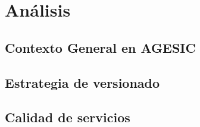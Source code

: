 \chapter{Análisis}
\label{capitulo3}

\section{Contexto General en AGESIC}
\label{capitulo3:cotexto_agesic}

\section{Estrategia de versionado}
\label{capitulo3:estrategia_versionado}

\section{Calidad de servicios}
\label{capitulo3:calidad_servicios}
